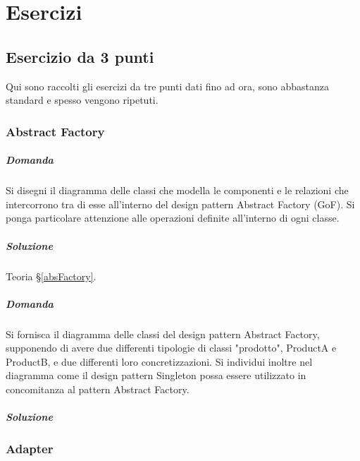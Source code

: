 \chapter{Esercizi}

\section{Esercizio da 3 punti}
Qui sono raccolti gli esercizi da tre punti dati fino ad ora, sono abbastanza standard e spesso vengono ripetuti.

\subsection{Abstract Factory}

\paragraph{Domanda}

Si disegni il diagramma delle classi che modella le componenti e le relazioni che intercorrono tra di esse all'interno del design pattern Abstract Factory (GoF). Si ponga particolare attenzione alle operazioni definite all'interno di ogni classe.

\paragraph{Soluzione} Teoria §\ref{absFactory}.

\paragraph{Domanda}

Si fornisca il diagramma delle classi del design pattern Abstract Factory, supponendo di avere due differenti tipologie di classi "prodotto", ProductA e ProductB, e due differenti loro concretizzazioni. Si individui inoltre nel diagramma come il design pattern Singleton possa essere utilizzato in concomitanza al pattern Abstract Factory.

\paragraph{Soluzione}


\subsection{Adapter}

